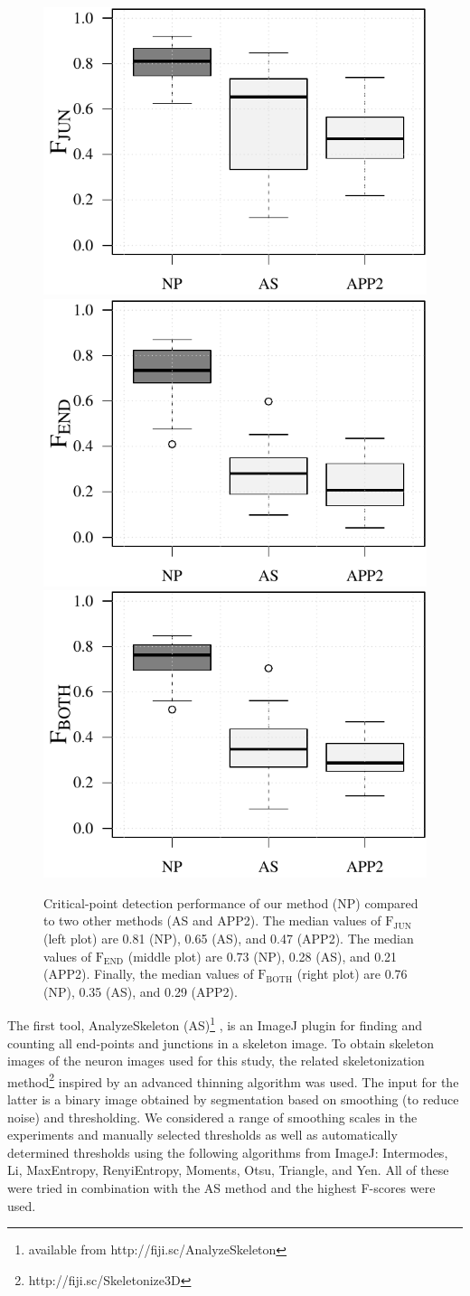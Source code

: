 \begin{figure}%
	\centering
	\includegraphics[width=0.33\columnwidth]{compareJUN_all}%
	\includegraphics[width=0.33\columnwidth]{compareEND_all}%
	\includegraphics[width=0.33\columnwidth]{compareBOTH_all}
	\caption{Critical-point detection performance of our method (NP) compared to two other methods (AS and APP2). The median values of $\textrm{F}_{\textrm{JUN}}$ (left plot) are 0.81 (NP), 0.65 (AS), and 0.47 (APP2). The median values of $\textrm{F}_{\textrm{END}}$ (middle plot) are 0.73 (NP), 0.28 (AS), and 0.21 (APP2). Finally, the median values of $\textrm{F}_{\textrm{BOTH}}$ (right plot) are 0.76 (NP), 0.35 (AS), and 0.29 (APP2).}
	\label{fig:comparison-all}
\end{figure}

The first tool, AnalyzeSkeleton (AS)\footnote{available from http://fiji.sc/AnalyzeSkeleton} \cite{arganda20103d}, is an ImageJ plugin for finding and counting all end-points and junctions in a skeleton image. To obtain skeleton images of the neuron images used for this study, the related skeletonization method\footnote{http://fiji.sc/Skeletonize3D} inspired by an advanced thinning algorithm \cite{lee1994building} was used. The input for the latter is a binary image obtained by segmentation based on smoothing (to reduce noise) and thresholding. We considered a range of smoothing scales in the experiments and manually selected thresholds as well as automatically determined thresholds using the following algorithms from ImageJ: Intermodes, Li, MaxEntropy, RenyiEntropy, Moments, Otsu, Triangle, and Yen. All of these were tried in combination with the AS method and the highest F-scores were used.

